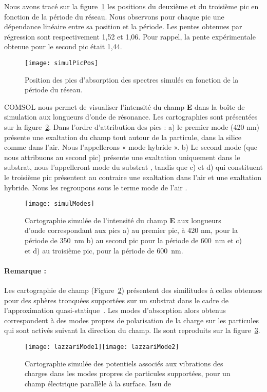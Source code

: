 Nous avons tracé sur la figure~\ref{simulPicPos} les positions du deuxième et du troisième pic en fonction de la période du réseau. Nous observons pour chaque pic une dépendance linéaire entre sa position et la période. Les pentes obtenues par régression sont respectivement 1,52 et 1,06. Pour rappel, la pente expérimentale obtenue pour le second pic était 1,44.\par 
\begin{figure}[!htb]
\centering
\texttt{[image: simulPicPos]}
\caption{Position des pics d’absorption des spectres simulés en fonction de la période du réseau.}
\label{simulPicPos}
\end{figure}

COMSOL nous permet de visualiser l’intensité du champ \textbf{E} dans la boîte de simulation aux longueurs d’onde de résonance. Les cartographies sont présentées sur la figure~\ref{simulModes}. Dans l’ordre d’attribution des pics : a) le premier mode (420 nm) présente une exaltation du champ tout autour de la particule, dans la silice comme dans l’air. Nous l’appellerons « mode hybride ». b) Le second mode (que nous attribuons au second pic) présente une exaltation uniquement dans le substrat, nous l'appelleront \og mode du substrat \fg, tandis que c) et d) qui constituent le troisième pic présentent au contraire une exaltation dans l’air et une exaltation hybride. Nous les regroupons sous le terme \og mode de l'air \fg.\par
\begin{figure}[!htb]
\centering
\texttt{[image: simulModes]}
\caption{Cartographie simulée de l’intensité du champ \textbf{E} aux longueurs d’onde correspondant aux pics a) au premier pic, à 420 nm, pour la période de 350~nm b) au second pic pour la période de 600~nm et c) et d) au troisième pic, pour la période de 600~nm.}
\label{simulModes}
\end{figure}

\paragraph*{Remarque :} Les cartographie de champ (Figure~\ref{simulModes}) présentent des similitudes à celles obtenues pour des sphères tronquées supportées sur un substrat dans le cadre de l'approximation quasi-statique~\cite{Lazzari02d, lazzari03, lazzari14}. Les modes d'absorption alors obtenus correspondent à des modes propres de polarisation de la charge sur les particules qui sont activés suivant la direction du champ. Ils sont reproduits sur la figure~\ref{lazzariModes}.\par 
\begin{figure}[!htb]
\centering
\texttt{[image: lazzariMode1]}\texttt{[image: lazzariMode2]}
\caption{Cartographie simulée des potentiels associés aux vibrations des charges dans les modes propres de particules supportées, pour un champ électrique parallèle à la surface. Issu de~\cite{lazzari14}}
\label{lazzariModes}
\end{figure}
